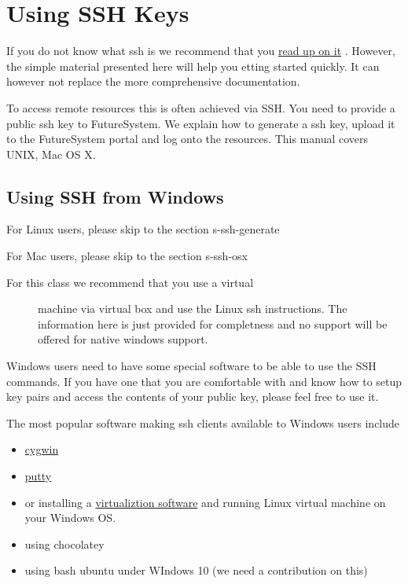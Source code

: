 \section{Using SSH Keys}

If you do not know what ssh is we recommend that you
\href{http://openssh.com/manual.html}{read up on it} . However, the
simple material presented here will help you etting started quickly. It
can however not replace the more comprehensive documentation.

To access remote resources this is often achieved via SSH. You need to
provide a public ssh key to FutureSystem. We explain how to generate a
ssh key, upload it to the FutureSystem portal and log onto the
resources. This manual covers UNIX, Mac OS X.

\subsection{Using SSH from Windows}\label{using-ssh-from-windows}

For Linux users, please skip to the section s-ssh-generate

For Mac users, please skip to the section s-ssh-osx

\begin{description}
\item[For this class we recommend that you use a virtual]
machine via virtual box and use the Linux ssh instructions. The
information here is just provided for completness and no support will be
offered for native windows support.
\end{description}

Windows users need to have some special software to be able to use the
SSH commands. If you have one that you are comfortable with and know how
to setup key pairs and access the contents of your public key, please
feel free to use it.

The most popular software making ssh clients available to Windows users
include

\begin{itemize}
\tightlist
\item
  \href{http://cygwin.com/install.html}{cygwin}
\item
  \href{http://the.earth.li/~sgtatham/putty/0.62/htmldoc/}{putty}
\item
  or installing a \href{http://cygwin.com/install.html}{virtualiztion
  software} and running Linux virtual machine on your Windows OS.
\item
  using chocolatey
\item
  using bash ubuntu under WIndows 10 (we need a contribution on this)
\end{itemize}

